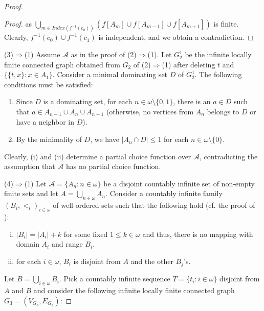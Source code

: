 \documentclass[12pt,reqno,a4paper]{amsart}
\theoremstyle{definition}
\begin{document}
\begin{proof}
\begin{proof}
			as $\bigcup_{m\in Index(f^{-1}(c_{0}))} (f[A_{m}]\cup f[A_{m-1}] \cup f[A_{m+1}])$ is finite. Clearly, $f^{-1}(c_{0})\cup f^{-1}(c_{1})$ is independent, and we obtain a contradiction. 
		\end{proof}
		
		(3)$\Rightarrow$(1) Assume $\mathcal{A}$ as in the proof of (2)$\Rightarrow$(1). 
		Let $G_2^{1}$ be the infinite locally finite connected graph obtained from $G_2$ of (2)$\Rightarrow$(1) after deleting $t$ and $\{\{t,x\}:x\in A_{1}\}$.
		Consider a minimal dominating set $D$ of $G_2^{1}$. The following conditions must be satisfied:
		\begin{enumerate}
			\item[(i)] Since $D$ is a dominating set, for each $n\in \omega\setminus\{0,1\}$, there is an $a\in D$ such that $a\in A_{n-1}\cup A_n \cup A_{n+1}$ (otherwise, no vertices from $A_n$ belongs to $D$ or have a neighbor in $D$).
			\item[(ii)] By the minimality of $D$, we have $|A_n \cap D| \leq 1$ for each $n\in \omega\setminus\{0\}$.
		\end{enumerate}
		Clearly, (i) and (ii) determine a partial choice function over $\mathcal{A}$, contradicting the assumption that $\mathcal{A}$ has no partial choice function.
		
		(4)$\Rightarrow$(1) Let $\mathcal{A}=\{A_{n}: n\in \omega\}$ be a disjoint countably infinite set of non-empty finite sets and let $A=\bigcup_{n\in \omega} A_{n}$. Consider a countably infinite family $(B_{i},<_{i})_{i\in \omega}$ of well-ordered sets such that the following hold (cf. the proof of \cite[Theorem 1, Remark 6]{DM2006}):
		
		\begin{enumerate}[(i)]
			\item  $\vert B_{i}\vert=\vert A_{i}\vert + k$ for some fixed $1\leq k\in \omega$ and thus, there is no mapping with domain $A_{i}$ and range $B_{i}$.
			\item for each $i\in \omega$, $B_{i}$ is disjoint from $A$ and the other $B_{j}$’s.
		\end{enumerate}
		
		Let $B=\bigcup_{i\in \omega} B_{i}$. Pick a countably infinite sequence $T=\{t_{i}:i\in \omega\}$ disjoint from $A$ and $B$ and consider the following infinite locally finite connected graph $G_{3}=(V_{G_{3}}, E_{G_{3}})$:
		

\end{proof}
\end{document}
